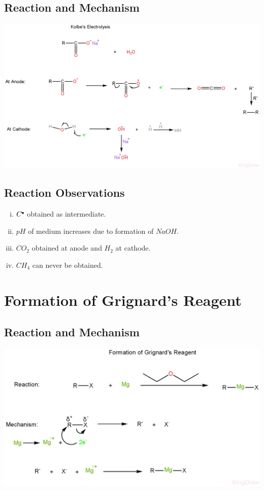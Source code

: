 \documentclass{article}
\newcommand*\fullcirc[1][0.3ex]{\tikz\fill (0,0) circle (#1);}
\begin{document}
\subsection{Reaction and Mechanism}
\begin{center}
    \includegraphics[scale=0.23]{Kolbe'sElectrolysis_1722168095985.JPEG}
\end{center}
\subsection{Reaction Observations}
\begin{enumerate}[i.]
    \item $C^{\fullcirc}$ obtained as intermediate.
    \item $pH$ of medium increases due to formation of $NaOH$.
    \item $CO_{2}$ obtained at anode and $H_{2}$ at cathode.
    \item $CH_{4}$ can never be obtained.
\end{enumerate}

\section{Formation of Grignard's Reagent}
\subsection{Reaction and Mechanism}
\begin{center}
    \includegraphics[scale=0.25]{FormationofGrignard'sReagent_1722171477216.JPEG}
\end{center}
\end{document}

